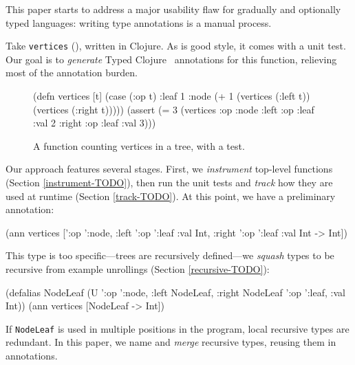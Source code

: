 

This paper starts to address a major usability flaw
for gradually and optionally typed languages:
writing type annotations is a manual process.

Take \texttt{vertices} (),
written in Clojure.
As is good style, it comes with a unit test.
Our goal is to \textit{generate} Typed Clojure~\cite{bonnaire2016practical}
annotations
for this function, relieving most of the annotation
burden.

\begin{figure}
\begin{cljlisting}
(defn vertices [t]
  (case (:op t)
    :leaf 1
    :node (+ 1 (vertices (:left t))
               (vertices (:right t)))))
(assert (= 3 (vertices
               {:op :node 
                :left {:op :leaf :val 2}
                :right {:op :leaf :val 3}})))
\end{cljlisting}
\caption{A function counting vertices in a tree, with a test.}
\label{infer:fig:vertices}
\end{figure}

Our approach features several stages.
First, we \textit{instrument} top-level functions
(Section \ref{instrument-TODO}),
then run the unit tests and \textit{track}
how they are used at runtime
(Section \ref{track-TODO}).
At this point, we have a preliminary
annotation:

\begin{cljlisting}
(ann vertices ['{:op ':node,
                 :left '{:op ':leaf :val Int},
                 :right '{:op ':leaf :val Int}}
               -> Int])
\end{cljlisting}

This type is too specific---trees are recursively
defined---we \textit{squash} types to be
recursive from example unrollings (Section \ref{recursive-TODO}):

\begin{cljlisting}
(defalias NodeLeaf 
  (U '{:op ':node, :left NodeLeaf, :right NodeLeaf}
     '{:op ':leaf, :val Int}))
(ann vertices [NodeLeaf -> Int])
\end{cljlisting}

%
If \texttt{NodeLeaf} is used in multiple positions
in the program, local recursive types are redundant.
In this paper, we name and \textit{merge} recursive
types, reusing them in annotations.
 
